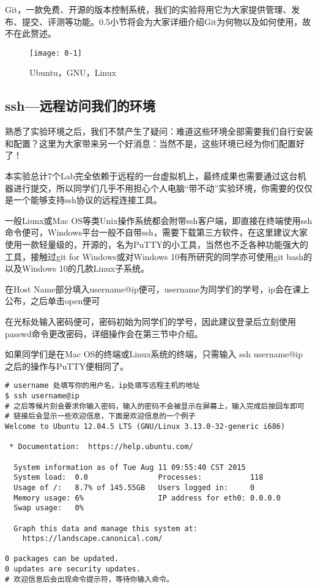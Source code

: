 Git，一款免费、开源的版本控制系统，我们的实验将用它为大家提供管理、发布、提交、评测等功能。0.5小节将会为大家详细介绍Git为何物以及如何使用，故不在此赘述。

\begin{figure}[htbp]
  \centering
  \texttt{[image: 0-1]}
  \caption{Ubuntu，GNU，Linux}\label{fig:0-1}
\end{figure}

\subsection{ssh—远程访问我们的环境}

熟悉了实验环境之后，我们不禁产生了疑问：难道这些环境全部需要我们自行安装和配置？这里为大家带来另一个好消息：当然不是，这些环境已经为你们配置好了！

本实验总计7个Lab完全依赖于远程的一台虚拟机上，最终成果也需要通过这台机器进行提交，所以同学们几乎不用担心个人电脑“带不动”实验环境，你需要的仅仅是一个能够支持ssh协议的远程连接工具。

一般Liunx或Mac OS等类Unix操作系统都会附带ssh客户端，即直接在终端使用ssh命令便可，Windows平台一般不自带ssh，需要下载第三方软件，在这里建议大家使用一款轻量级的，开源的，名为PuTTY的小工具，当然也不乏各种功能强大的工具，接触过git for Windows或对Windows 10有所研究的同学亦可使用git bash的以及Windows 10的几款Linux子系统。

在Host Name部分填入username@ip便可，username为同学们的学号，ip会在课上公布，之后单击open便可

在光标处输入密码便可，密码初始为同学们的学号，因此建议登录后立刻使用passwd命令更改密码，详细操作会在第三节中介绍。

如果同学们是在Mac OS的终端或Linux系统的终端，只需输入 ssh username@ip 之后的操作与PuTTY便相同了。

\begin{verbatim}
# username 处填写你的用户名，ip处填写远程主机的地址
$ ssh username@ip
# 之后等候片刻会要求你输入密码，输入的密码不会被显示在屏幕上，输入完成后按回车即可
# 链接后会显示一些欢迎信息，下面是欢迎信息的一个例子
Welcome to Ubuntu 12.04.5 LTS (GNU/Linux 3.13.0-32-generic i686)

 * Documentation:  https://help.ubuntu.com/

  System information as of Tue Aug 11 09:55:40 CST 2015
  System load:  0.0                Processes:           118
  Usage of /:   8.7% of 145.55GB   Users logged in:     0
  Memory usage: 6%                 IP address for eth0: 0.0.0.0
  Swap usage:   0%

  Graph this data and manage this system at:
    https://landscape.canonical.com/

0 packages can be updated.
0 updates are security updates.
# 欢迎信息后会出现命令提示符，等待你输入命令。
\end{verbatim}

